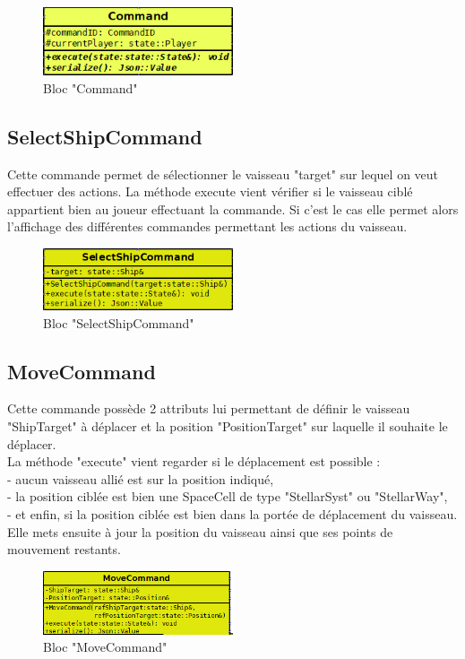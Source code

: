 \begin{figure}[!h]
\centering
\includegraphics[width=0.5\textwidth]{pics/engine_pics/command.PNG}
\caption[Bloc "Command"]{\label{figure_simple}Bloc "Command"}
\end{figure}

\subsection{SelectShipCommand}

Cette commande permet de sélectionner le vaisseau "target" sur lequel on veut effectuer des actions.
La méthode execute vient vérifier si le vaisseau ciblé appartient bien au joueur effectuant la commande. Si c'est le cas elle permet alors l'affichage des différentes commandes permettant les actions du vaisseau.
\\
\begin{figure}[!h]
\centering
\includegraphics[width=0.5\textwidth]{pics/engine_pics/SelectShipCommand.PNG}
\caption[Bloc "SelectShipCommand"]{\label{figure_simple}Bloc "SelectShipCommand"}
\end{figure}

\subsection{MoveCommand}

Cette commande possède 2 attributs lui permettant de définir le vaisseau "ShipTarget" à déplacer et la position "PositionTarget" sur laquelle il souhaite le déplacer. \\
La méthode "execute" vient regarder si le déplacement est possible : \\
- aucun vaisseau allié est sur la position indiqué, \\
- la position ciblée est bien une SpaceCell de type "StellarSyst" ou "StellarWay", \\
- et enfin, si la position ciblée est bien dans la portée de déplacement du vaisseau. \\
Elle mets ensuite à jour la position du vaisseau ainsi que ses points de mouvement restants.
\\
\begin{figure}[!h]
\centering
\includegraphics[width=0.5\textwidth]{pics/engine_pics/MoveCommand.PNG}
\caption[Bloc "MoveCommand"]{\label{figure_simple}Bloc "MoveCommand"}
\end{figure}

